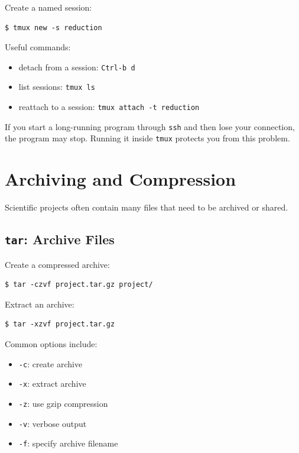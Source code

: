 Create a named session:

\begin{lstlisting}
$ tmux new -s reduction
\end{lstlisting}

Useful commands:

\begin{itemize}
\item detach from a session: \texttt{Ctrl-b d}
\item list sessions: \texttt{tmux ls}
\item reattach to a session: \texttt{tmux attach -t reduction}
\end{itemize}

\begin{protip}
If you start a long-running program through \texttt{ssh} and then lose
your connection, the program may stop. Running it inside \texttt{tmux}
protects you from this problem.
\end{protip}

\section{Archiving and Compression}

Scientific projects often contain many files that need to be archived or shared.

\subsection{\texttt{tar}: Archive Files}

Create a compressed archive:

\begin{lstlisting}
$ tar -czvf project.tar.gz project/
\end{lstlisting}

Extract an archive:

\begin{lstlisting}
$ tar -xzvf project.tar.gz
\end{lstlisting}

Common options include:

\begin{itemize}
\item \texttt{-c}: create archive
\item \texttt{-x}: extract archive
\item \texttt{-z}: use gzip compression
\item \texttt{-v}: verbose output
\item \texttt{-f}: specify archive filename
\end{itemize}

